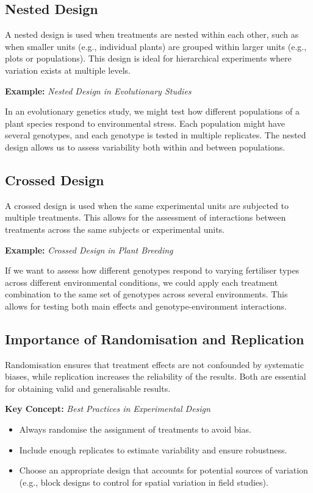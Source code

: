 \documentclass[12pt,a4paper]{article}
\newenvironment{keyconceptbox}[1][]
{\begin{basebox}[linecolor=uqblue]
\textbf{\color{uqblue}Key Concept:} \textit{#1}\par\noindent\ignorespaces}
{\end{basebox}}
\newenvironment{example}[1][]
{\begin{basebox}[linecolor=uqgold]
\textbf{\color{uqgold}Example:} \textit{#1}\par\noindent\ignorespaces}
{\end{basebox}}
\begin{document}
\subsection{Nested Design}

A nested design is used when treatments are nested within each other, such as when smaller units (e.g., individual plants) are grouped within larger units (e.g., plots or populations). This design is ideal for hierarchical experiments where variation exists at multiple levels.

\begin{example}[Nested Design in Evolutionary Studies]
In an evolutionary genetics study, we might test how different populations of a plant species respond to environmental stress. Each population might have several genotypes, and each genotype is tested in multiple replicates. The nested design allows us to assess variability both within and between populations.
\end{example}

\subsection{Crossed Design}

A crossed design is used when the same experimental units are subjected to multiple treatments. This allows for the assessment of interactions between treatments across the same subjects or experimental units.

\begin{example}[Crossed Design in Plant Breeding]
If we want to assess how different genotypes respond to varying fertiliser types across different environmental conditions, we could apply each treatment combination to the same set of genotypes across several environments. This allows for testing both main effects and genotype-environment interactions.
\end{example}

\subsection{Importance of Randomisation and Replication}

Randomisation ensures that treatment effects are not confounded by systematic biases, while replication increases the reliability of the results. Both are essential for obtaining valid and generalisable results.

\begin{keyconceptbox}[Best Practices in Experimental Design]
\begin{itemize}
    \item Always randomise the assignment of treatments to avoid bias.
    \item Include enough replicates to estimate variability and ensure robustness.
    \item Choose an appropriate design that accounts for potential sources of variation (e.g., block designs to control for spatial variation in field studies).
\end{itemize}
\end{keyconceptbox}
\end{document}
